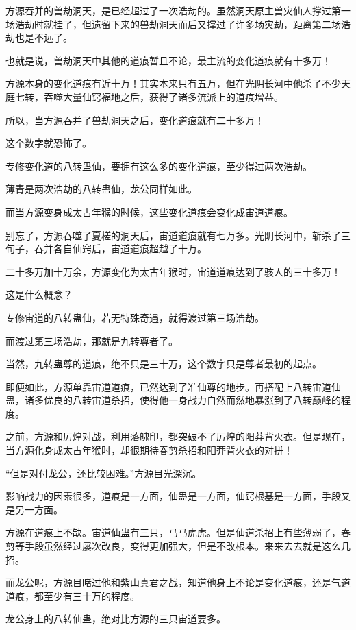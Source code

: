 \begin{this_body}
方源吞并的兽劫洞天，是已经超过了一次浩劫的。虽然洞天原主兽灾仙人撑过第一场浩劫时就挂了，但遗留下来的兽劫洞天而后又撑过了许多场灾劫，距离第二场浩劫也是不远了。

也就是说，兽劫洞天中其他的道痕暂且不论，最主流的变化道痕就有十多万！

方源本身的变化道痕有近十万！其实本来只有五万，但在光阴长河中他杀了不少天庭七转，吞噬大量仙窍福地之后，获得了诸多流派上的道痕增益。

所以，当方源吞并了兽劫洞天之后，变化道痕就有二十多万！

这个数字就恐怖了。

专修变化道的八转蛊仙，要拥有这么多的变化道痕，至少得过两次浩劫。

薄青是两次浩劫的八转蛊仙，龙公同样如此。

而当方源变身成太古年猴的时候，这些变化道痕会变化成宙道道痕。

别忘了，方源吞噬了夏槎的洞天后，宙道道痕就有七万多。光阴长河中，斩杀了三旬子，吞并各自仙窍后，宙道道痕超越了十万。

二十多万加十万余，方源变化为太古年猴时，宙道道痕达到了骇人的三十多万！

这是什么概念？

专修宙道的八转蛊仙，若无特殊奇遇，就得渡过第三场浩劫。

而渡过第三场浩劫，那就是九转尊者了。

当然，九转蛊尊的道痕，绝不只是三十万，这个数字只是尊者最初的起点。

即便如此，方源单靠宙道道痕，已然达到了准仙尊的地步。再搭配上八转宙道仙蛊，诸多优良的八转宙道杀招，使得他一身战力自然而然地暴涨到了八转巅峰的程度。

之前，方源和厉煌对战，利用落魄印，都突破不了厉煌的阳莽背火衣。但是现在，当方源化身成太古年猴时，却很期待春剪杀招和阳莽背火衣的对拼！

“但是对付龙公，还比较困难。”方源目光深沉。

影响战力的因素很多，道痕是一方面，仙蛊是一方面，仙窍根基是一方面，手段又是另一方面。

方源在道痕上不缺。宙道仙蛊有三只，马马虎虎。但是仙道杀招上有些薄弱了，春剪等手段虽然经过屡次改良，变得更加强大，但是不改根本。来来去去就是这么几招。

而龙公呢，方源目睹过他和紫山真君之战，知道他身上不论是变化道痕，还是气道道痕，都至少有三十万的程度。

龙公身上的八转仙蛊，绝对比方源的三只宙道要多。


\end{this_body}
